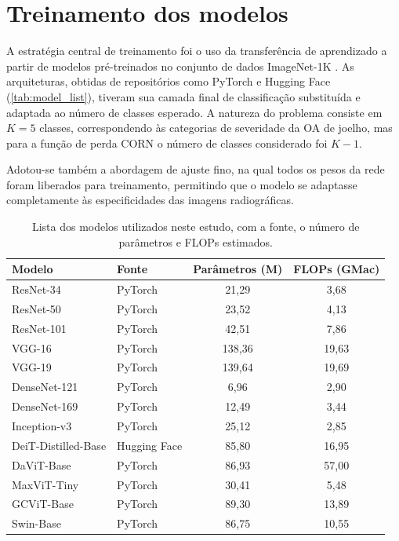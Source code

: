 \section{Treinamento dos modelos}

A estratégia central de treinamento foi o uso da transferência de aprendizado a partir de modelos pré-treinados no conjunto de dados ImageNet-1K \cite{Russakovsky2015}. As arquiteturas, obtidas de repositórios como PyTorch e Hugging Face (\autoref{tab:model_list}), tiveram sua camada final de classificação substituída e adaptada ao número de classes esperado. A natureza do problema consiste em $K=5$ classes, correspondendo às categorias de severidade da OA de joelho, mas para a função de perda CORN o número de classes considerado foi $K-1$.

Adotou-se também a abordagem de ajuste fino, na qual todos os pesos da rede foram liberados para treinamento, permitindo que o modelo se adaptasse completamente às especificidades das imagens radiográficas.

\begin{table}[!htbp]
    \centering
    \begin{tabular}{|l|l|c|c|}
        \hline
        \textbf{Modelo} & \textbf{Fonte} & \textbf{Parâmetros (M)} & \textbf{FLOPs (GMac)} \\
        \hline
        ResNet-34 & PyTorch & 21,29 & 3,68 \\
        \hline
        ResNet-50 & PyTorch & 23,52 & 4,13 \\
        \hline
        ResNet-101 & PyTorch & 42,51 & 7,86 \\
        \hline
        VGG-16 & PyTorch & 138,36 & 19,63 \\
        \hline
        VGG-19 & PyTorch & 139,64 & 19,69 \\
        \hline
        DenseNet-121 & PyTorch & 6,96 & 2,90 \\
        \hline
        DenseNet-169 & PyTorch & 12,49 & 3,44 \\
        \hline
        Inception-v3 & PyTorch & 25,12 & 2,85 \\
        \hline
        DeiT-Distilled-Base & Hugging Face & 85,80 & 16,95 \\
        \hline
        DaViT-Base & PyTorch & 86,93 & 57,00 \\
        \hline
        MaxViT-Tiny & PyTorch & 30,41 & 5,48 \\
        \hline
        GCViT-Base & PyTorch & 89,30 & 13,89 \\
        \hline
        Swin-Base & PyTorch & 86,75 & 10,55 \\
        \hline
    \end{tabular}
    \caption{Lista dos modelos utilizados neste estudo, com a fonte, o número de parâmetros e FLOPs estimados.}
    \label{tab:model_list}
\end{table}

